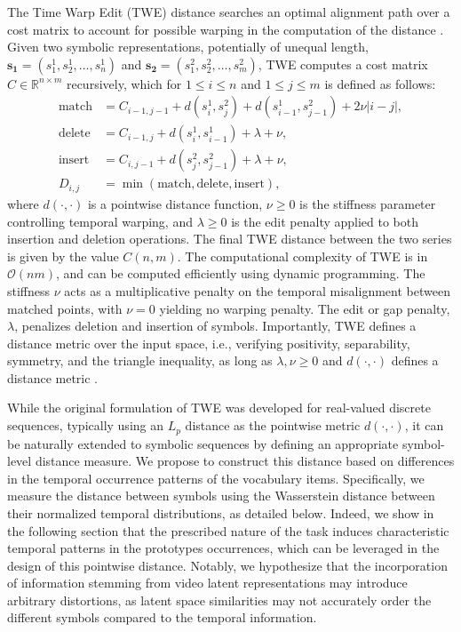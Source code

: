 \begin{chapterabstract}
        The Time Warp Edit (TWE) distance searches an optimal alignment path over a cost matrix to account for possible warping in the computation of the distance \cite{Marteau2009}. Given two symbolic representations, potentially of unequal length, $\mathbf{s_1} = (s^1_1, s^1_2, \dots, s^1_n)$ and $\mathbf{s_2} = (s^2_1, s^2_2, \dots, s^2_m)$, TWE computes a cost matrix $C \in \mathbb{R}^{n \times m}$ recursively, which for $1 \leq i \leq n$ and $1 \leq j \leq m$ is defined as follows:
        \begin{align*}
        \text{match} &= C_{i-1,j-1} + d(s^1_i, s^2_j) + d(s^1_{i-1}, s^2_{j-1}) + 2\nu |i-j|, \\
        \text{delete} &= C_{i-1,j} + d(s^1_i, s^1_{i-1}) + \lambda + \nu, \\
        \text{insert} &= C_{i,j-1} + d(s^2_j, s^2_{j-1}) + \lambda + \nu, \\
        D_{i,j} &= \min(\text{match}, \text{delete}, \text{insert}),
        \end{align*}
        where $d(\cdot,\cdot)$ is a pointwise distance function, $\nu\geq 0$ is the stiffness parameter controlling temporal warping, and $\lambda \geq 0$ is the edit penalty applied to both insertion and deletion operations. The final TWE distance between the two series is given by the value $C(n,m)$. The computational complexity of TWE is in $\mathcal{O}(nm)$, and can be computed efficiently using dynamic programming. The stiffness $\nu$ acts as a multiplicative penalty on the temporal misalignment between matched points, with $\nu = 0$ yielding no warping penalty. The edit or gap penalty, $\lambda$, penalizes deletion and insertion of symbols. Importantly, TWE defines a distance metric over the input space, i.e., verifying positivity, separability, symmetry, and the triangle inequality, as long as $\lambda, \nu \geq 0$ and $d(\cdot,\cdot)$ defines a distance metric \cite{Marteau2009}.

        While the original formulation of TWE was developed for real-valued discrete sequences, typically using an $L_p$ distance as the pointwise metric $d(\cdot,\cdot)$, it can be naturally extended to symbolic sequences by defining an appropriate symbol-level distance measure. We propose to construct this distance based on differences in the temporal occurrence patterns of the vocabulary items. Specifically, we measure the distance between symbols using the Wasserstein distance between their normalized temporal distributions, as detailed below. Indeed, we show in the following section that the prescribed nature of the task induces characteristic temporal patterns in the prototypes occurrences, which can be leveraged in the design of this pointwise distance. Notably, we hypothesize that the incorporation of information stemming from video latent representations may introduce arbitrary distortions, as latent space similarities may not accurately order the different symbols compared to the temporal information. 



\end{chapterabstract}
